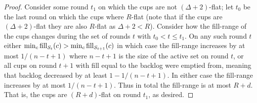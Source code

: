 \begin{proof}
  Consider some round $t_1$ on which the cups are not $(\Delta +
  2)$-flat; let $t_0$ be the last round on which the cups where
  $R$-flat (note that if the cups are $(\Delta+2)$-flat they are
  also $R$-flat as $\Delta + 2 < R$). Consider how the fill-range
  of the cups changes during the set of rounds
  $t$ with $t_0 < t \le t_1$. On any such round $t$ either $\min_c
  \operatorname{\textnormal{fill}}_{S_t}(c) > \min_c \operatorname{\textnormal{fill}}_{S_{t+1}}(c)$ in which case the
  fill-range increases by at most $1/(n-t+1)$ where $n-t+1$ is the
  size of the active set on round $t$, or all cups on round $t+1$
  with fill equal to the backlog were emptied from, meaning that
  backlog decreased by at least $1-1/(n-t+1)$. In either case the
  fill-range increases by at most $1/(n-t+1)$. Thus in total the
  fill-range is at most $R + d$. That is, the cups are
  $(R+d)$-flat on round $t_1$, as desired.

\end{proof}

